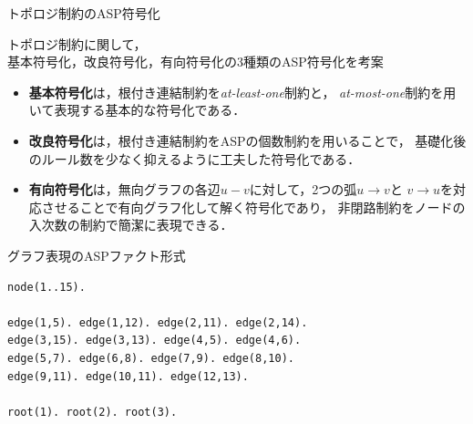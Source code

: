 \documentclass[dvipdfmx,11pt]{beamer}
\begin{document}
\begin{frame}{トポロジ制約のASP符号化}
  \renewcommand{\thefootnote}{\fnsymbol{footnote}}
  \setcounter{footnote}{1}
\begin{block}{}
 \centering
 トポロジ制約に関して，\\
 基本符号化，改良符号化，有向符号化の3種類のASP符号化を考案
\end{block}
 \vfill
 \begin{itemize}
  \item \textbf{基本符号化}は，根付き連結制約を\textit{at-least-one}制約と，
        \textit{at-most-one}制約を用いて表現する基本的な符号化である．
  \item \textbf{改良符号化}は，根付き連結制約をASPの個数制約を用いることで，
        基礎化後のルール数を少なく抑えるように工夫した符号化である．
  \item \textbf{有向符号化}は，無向グラフの各辺$u-v$に対して，2つの弧$u\rightarrow v$と
        $v\rightarrow u$を対応させることで有向グラフ化して解く符号化であり，
        非閉路制約をノードの入次数の制約で簡潔に表現できる．
 \end{itemize}
\end{frame}
\begin{frame}[fragile]{グラフ表現のASPファクト形式}
\begin{figure}[t]
 \centering
 \scalebox{0.45}{}
\end{figure}
\begin{exampleblock}{}
\begin{lstlisting}
node(1..15).

edge(1,5). edge(1,12). edge(2,11). edge(2,14). 
edge(3,15). edge(3,13). edge(4,5). edge(4,6). 
edge(5,7). edge(6,8). edge(7,9). edge(8,10).
edge(9,11). edge(10,11). edge(12,13).

root(1). root(2). root(3).
\end{lstlisting}
\end{exampleblock}
\end{frame}
\end{document}
